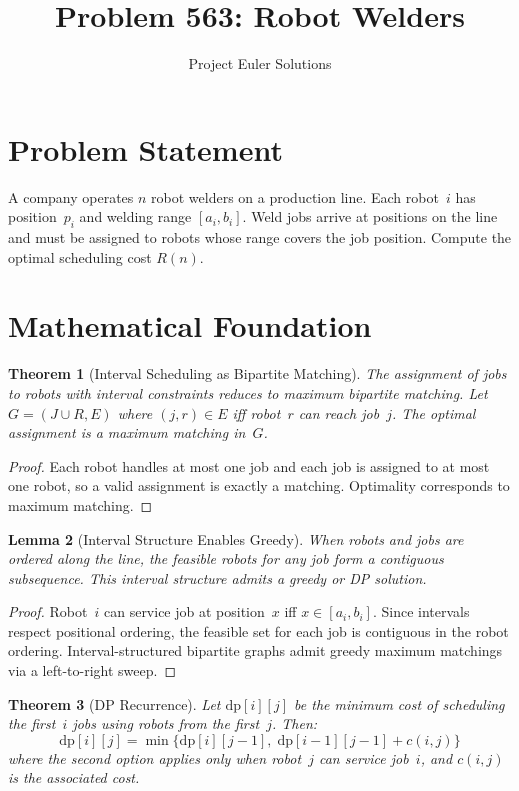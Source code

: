 \documentclass[11pt]{article}
\title{Problem 563: Robot Welders}
\author{Project Euler Solutions}
\date{}
\newtheorem{theorem}{Theorem}
\newtheorem{lemma}[theorem]{Lemma}
\begin{document}
\maketitle

\section{Problem Statement}

A company operates $n$ robot welders on a production line. Each robot~$i$ has position~$p_i$ and welding range $[a_i, b_i]$. Weld jobs arrive at positions on the line and must be assigned to robots whose range covers the job position. Compute the optimal scheduling cost $R(n)$.

\section{Mathematical Foundation}

\begin{theorem}[Interval Scheduling as Bipartite Matching]
The assignment of jobs to robots with interval constraints reduces to maximum bipartite matching. Let $G = (J \cup R, E)$ where $(j,r)\in E$ iff robot~$r$ can reach job~$j$. The optimal assignment is a maximum matching in~$G$.
\end{theorem}

\begin{proof}
Each robot handles at most one job and each job is assigned to at most one robot, so a valid assignment is exactly a matching. Optimality corresponds to maximum matching.
\end{proof}

\begin{lemma}[Interval Structure Enables Greedy]
When robots and jobs are ordered along the line, the feasible robots for any job form a contiguous subsequence. This interval structure admits a greedy or DP solution.
\end{lemma}

\begin{proof}
Robot~$i$ can service job at position~$x$ iff $x \in [a_i, b_i]$. Since intervals respect positional ordering, the feasible set for each job is contiguous in the robot ordering. Interval-structured bipartite graphs admit greedy maximum matchings via a left-to-right sweep.
\end{proof}

\begin{theorem}[DP Recurrence]
Let $\mathrm{dp}[i][j]$ be the minimum cost of scheduling the first~$i$ jobs using robots from the first~$j$. Then:
\[
\mathrm{dp}[i][j] = \min\!\Big\{\mathrm{dp}[i][j-1],\;\mathrm{dp}[i-1][j-1]+c(i,j)\Big\}
\]
where the second option applies only when robot~$j$ can service job~$i$, and $c(i,j)$ is the associated cost.
\end{theorem}
\end{document}
